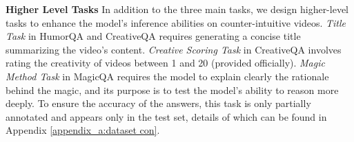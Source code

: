 \noindent\textbf{Higher Level Tasks}\quad
In addition to the three main tasks, we design higher-level tasks to enhance the model's inference abilities on counter-intuitive videos. \textit{Title Task} in HumorQA and CreativeQA requires generating a concise title summarizing the video's content. \textit{Creative Scoring Task} in CreativeQA involves rating the creativity of videos between 1 and 20 (provided officially). \textit{Magic Method Task} in MagicQA requires the model to explain clearly the rationale behind the magic, and its purpose is to test the model's ability to reason more deeply. To ensure the accuracy of the answers, this task is only partially annotated and appears only in the test set, details of which can be found in Appendix \ref{appendix_a:dataset con}.

% 

